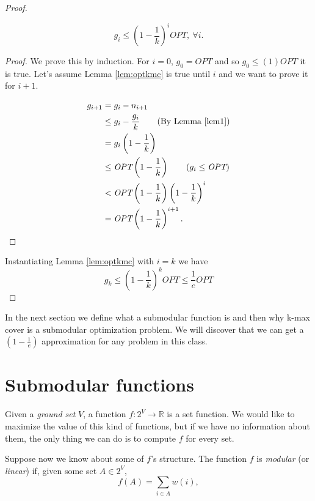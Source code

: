 \begin{proof}
	\begin{lem}\label{lem:optkmc}
		\begin{equation}
		g_i \leq \left(1 - \frac{1}{k}\right)^i\textit{OPT},\ \forall i.
		\end{equation}
	\end{lem}
	\begin{proof}
		We prove this by induction. For $i = 0$, $g_0 = \textit{OPT}$ and so $g_0 \leq (1)\textit{OPT}$ it is true. Let's assume Lemma \ref{lem:optkmc} is true until $i$ and we want to prove it for $i+1$.
		
		\begin{align}
		g_{i + 1} &= g_i - n_{i+1}\\
		&\leq g_i - \frac{g_i}{k} \tag{By Lemma \ref{lem1}}\\
		&= g_i\left(1 - \frac{1}{k}\right)\\
		&\leq \textit{OPT}\left(1 - \frac{1}{k}\right) \tag{$g_i \leq \textit{OPT}$}\\
		&< \textit{OPT}\left(1 - \frac{1}{k}\right)\left(1 - \frac{1}{k}\right)^i\\
		&= \textit{OPT}\left(1 - \frac{1}{k}\right)^{i+1}.
		\end{align}
	\end{proof}
	
	Instantiating Lemma \ref{lem:optkmc} with $i = k$ we have
	\begin{equation}
	g_k \leq \left(1 -	\frac{1}{k}\right)^k\textit{OPT} \leq \frac{1}{e}\textit{OPT}
	\end{equation}
	
\end{proof}
In the next section we define what a submodular function is and then why k-max cover is a submodular optimization problem. We will discover that we can get a $(1 - \frac{1}{e})$ approximation for any problem in this class. 


\section{Submodular functions}

Given a \emph{ground set} $V$, a function $f:2^V \rightarrow \mathbb{R}$ is a set function. We would like to maximize the value of this kind of functions, but if we have no information about them, the only thing we can do is to compute $f$ for every set.

Suppose now we know about some of $f$'s structure. The function $f$ is \emph{modular} (or \emph{linear}) if, given some set $A \in 2^V$,
\begin{equation}\label{eq:modular}
	f(A) = \sum_{i \in A} w(i),
\end{equation}

